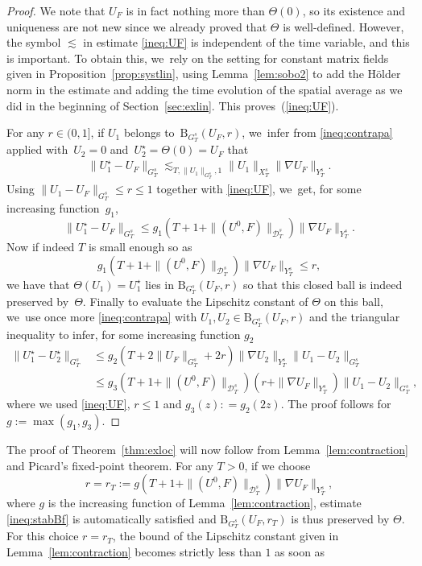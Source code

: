 \documentclass[10pt]{amsart}
\theoremstyle{definition}
\newcommand\B{\mathrm{B}}
\begin{document}
\begin{proof}
We note that $U_F$ is in fact nothing more than $\Theta(0)$, so its existence and uniqueness are not new since we already proved that $\Theta$ is well-defined. However, the symbol $\lesssim$ in estimate \eqref{ineq:UF} is independent of the time variable, and this is important. To obtain this, we~rely on the setting for constant matrix fields given in Proposition~\ref{prop:systlin}, using Lemma~\ref{lem:sobo2} to add the Hölder norm in the estimate and adding the time evolution of the spatial average as we did in the beginning of Section~\ref{sec:exlin}. This proves~(\ref{ineq:UF}).

For any $r\in(0,1]$, if $U_1 $ belongs to~$\B_{G_T^s}(U_F,r)$, we~infer from \eqref{ineq:contrapa} applied with~$U_2=0$ and~$U_2^\star = \Theta(0)=U_F$ that
\begin{align}\label{ineq:stabBf}
\|U_1^\star - U_F\|_{G_T^s} \lesssim_{T,\|U_1\|_{G_T^s},1} \|U_1\|_{X_T^s}\|\nabla U_F\|_{Y_T^s}.
\end{align}
Using $\|U_1-U_F\|_{G_T^s}\!\leq\! r\! \leq\! 1$ together with \eqref{ineq:UF}, we~get, for some increasing function~$g_1$,
\[
\|U_1^\star - U_F\|_{G_T^s} \leq g_1(T+1+ \| (U^0,F)\| _{\mathcal D_T^{s}})\|\nabla U_F\|_{Y_T^s}.
\]
Now if indeed $T$ is small enough so as
\[
g_1(T+1+ \| (U^0,F)\| _{\mathcal D_T^{s}}) \|\nabla U_F\|_{Y_T^s} \leq r,
\]
we have that $\Theta(U_1) = U_1^\star$ lies in $\B_{G_T^s}(U_F,r)$ so that this closed ball is indeed preserved by~$\Theta$. Finally to evaluate the Lipschitz constant of $\Theta$ on this ball, we~use once more \eqref{ineq:contrapa} with $U_1,U_2\in \B_{G_T^s}(U_F,r)$ and the triangular inequality to infer, for some increasing function $g_2$
\begin{align*}
\|U_1^\star - U_2^\star\|_{G_T^s} &\leq g_2(T+2\|U_F\|_{G_T^s}+2r) \|\nabla U_2\|_{Y_T^s}\|U_1-U_2\|_{G_T^s}\\
&\le g_3(T+1+ \| (U^0,F)\| _{\mathcal D_T^{s}})(r+\|\nabla U_F\|_{Y_T^s}) \|U_1-U_2\|_{G_T^s},
\end{align*}
where we used \eqref{ineq:UF}, $r\leq 1$ and $g_3(z): = g_2(2z)$. The proof follows for $g:=\max(g_1,g_3)$.
\end{proof}
The proof of Theorem~\ref{thm:exloc} will now follow from Lemma~\ref{lem:contraction} and Picard's fixed-point theorem. For any $T>0$, if we choose
\[
r=r_T:= g(T+1+ \| (U^0,F)\| _{\mathcal D_T^{s}})\|\nabla U_F\|_{Y_T^s},
\]
where $g$ is the increasing function of Lemma~\ref{lem:contraction}, estimate \eqref{ineq:stabBf} is automatically satisfied and $\B_{G_T^s}(U_F,r_T)$ is thus preserved by $\Theta$. For this choice $r=r_T$, the bound of the Lipschitz constant given in Lemma~\ref{lem:contraction} becomes strictly less than $1$ as soon as
\end{document}
